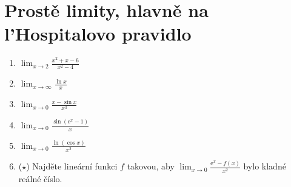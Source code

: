\documentclass[12pt,a4paper]{article}
\def\ee{\mathrm{e}}
\begin{document}
\section*{Prostě limity, hlavně na l'Hospitalovo pravidlo}

\everymath{\displaystyle}

\begin{enumerate}
	\item $\lim_{x \to 2}\frac{x^2 + x - 6}{x^2 - 4}$
	\item $\lim_{x \to \infty} \frac{\ln x}{x}$
	\item $\lim_{x \to 0} \frac{x - \sin x}{x^3}$
	\item $\lim_{x \to 0} \frac{\sin(\ee^x - 1)}{x}$
	\item $\lim_{x \to 0} \frac{\ln(\cos x)}{x^2}$
	\item ($\star$) Najděte lineární funkci $f$ takovou, aby $\lim_{x \to 0}\frac{\ee^x - f(x)}{x^2}$ bylo kladné reálné číslo.
\end{enumerate}

\newpage

%
\end{document}
